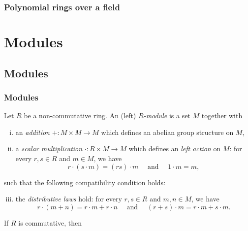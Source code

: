 \documentclass{../../large}
\begin{document}
\section{Polynomial rings over a field}
\begin{prb}
\end{prb}
\begin{prb}
\end{prb}
\begin{prb}
\end{prb}











\part{Modules}



\chapter{Modules}
\section{Modules}

\begin{prb}
Let $R$ be a non-commutative ring.
An (left) \emph{$R$-module} is a set $M$ together with 
\begin{enumerate}[(i)]
\item an \emph{addition} $+:M\times M\to M$ which defines an abelian group structure on $M$,
\item a \emph{scalar multiplication} $\cdot:R\times M\to M$ which defines an \emph{left action} on $M$: for every $r,s\in R$ and $m\in M$, we have
\[r\cdot(s\cdot m)=(rs)\cdot m\quad\text{ and }\quad1\cdot m=m,\]
\end{enumerate}
such that the following compatibility condition holds:
\begin{enumerate}[(i)]\setcounter{enumi}{2}
\item the \emph{distributive laws} hold: for every $r,s\in R$ and $m,n\in M$, we have
\[r\cdot (m+n)=r\cdot m+r\cdot n\quad\text{ and }\quad(r+s)\cdot m=r\cdot m+s\cdot m.\]
\end{enumerate}
\begin{parts}
\item If $R$ is commutative, then
\end{parts}
\end{prb}
\end{document}
